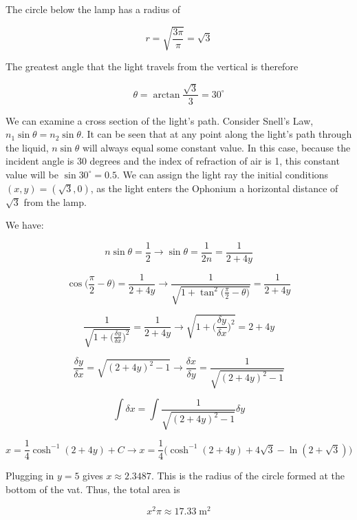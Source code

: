\begin{solution}
    The circle below the lamp has a radius of 

$$r = \sqrt{\frac{3\pi}{\pi}} = \sqrt{3}$$

The greatest angle that the light travels from the vertical is therefore

$$\theta = \arctan{\frac{\sqrt{3}}{3}} = 30^{\circ}$$

We can examine a cross section of the light's path. Consider Snell's Law, $n_1\sin{\theta} = n_2\sin{\theta}$. It can be seen that at any point along the light's path through the liquid, $n\sin{\theta}$ will always equal some constant value. In this case, because the incident angle is 30 degrees and the index of refraction of air is 1, this constant value will be $\sin{30^{\circ}} = 0.5$. We can assign the light ray the initial conditions $(x,y) = (\sqrt{3},0)$, as the light enters the Ophonium a horizontal distance of $\sqrt{3}$ from the lamp.

We have:

$$n\sin{\theta} = \frac{1}{2}\longrightarrow \sin{\theta} = \frac{1}{2n} = \frac{1}{2+4y}$$

$$\cos\bigg(\frac{\pi}{2}-\theta\bigg) = \frac{1}{2+4y}\longrightarrow\frac{1}{\sqrt{1+\tan^2\big(\frac{\pi}{2}-\theta\big)}} = \frac{1}{2+4y}$$

$$\frac{1}{\sqrt{1+\big(\frac{\delta y}{\delta x}\big)^2}} = \frac{1}{2+4y}\longrightarrow \sqrt{1+\big(\frac{\delta y}{\delta x}\big)^2} = 2 + 4y$$

$$\frac{\delta y}{\delta x} = \sqrt{(2+4y)^2 - 1}\longrightarrow \frac{\delta x}{\delta y} = \frac{1}{\sqrt{(2+4y)^2 - 1}}$$

$$\int \delta x = \int\frac{1}{\sqrt{(2+4y)^2 - 1}}\delta y$$

$$x = \frac{1}{4}\cosh^{-1}(2+4y)+ C \longrightarrow x = \frac{1}{4}\bigg(\cosh^{-1}(2+4y) + 4\sqrt{3} - \ln(2 + \sqrt{3})\bigg)$$

Plugging in $y = 5$ gives $x \approx 2.3487$. This is the radius of the circle formed at the bottom of the vat. Thus, the total area is

$$x^2\pi \approx \boxed{17.33\;\mathrm{m^2}}$$
\end{solution}
